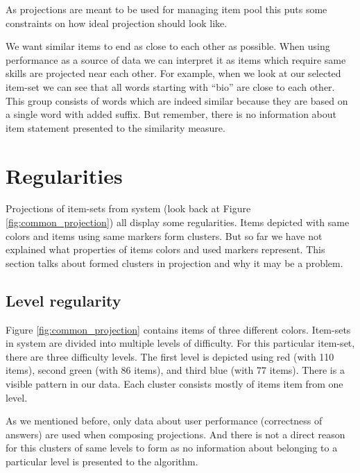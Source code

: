 \documentclass[
  digital, %
  table,   %
  nolof,     %
  nolot,     %
  nocover,
  color,
  final, %
]{fithesis3}
\begin{document}

As projections are meant to be used for managing item pool this puts some constraints on how ideal projection should look like.

We want similar items to end as close to each other as possible. When using performance as a source of data we can interpret it as items which require same skills are projected near each other. For example, when we look at our selected item-set we can see that all words starting with ``bio'' are close to each other. This group consists of words which are indeed similar because they are based on a single word with added suffix. But remember, there is no information about item statement presented to the similarity measure.


\section{Regularities}\label{regularities}


Projections of item-sets from system \umimeCesky{} (look back at Figure \ref{fig:common_projection}) all display some regularities. Items depicted with same colors and items using same markers form clusters. But so far we have not explained what properties of items colors and used markers represent. This section talks about formed clusters in projection and why it may be a problem.


\subsection{Level regularity}\label{regularities-level-regularity}


Figure \ref{fig:common_projection} contains items of three different colors. Item-sets in system \umimeCesky{} are divided into multiple levels of difficulty. For this particular item-set, there are three difficulty levels. The first level is depicted using red (with 110 items), second green (with 86 items), and third blue (with 77 items). There is a  visible pattern in our data. Each cluster consists mostly of items item from one level.

As we mentioned before, only data about user performance (correctness of answers) are used when composing projections. And there is not a direct reason for this clusters of same levels to form as no information about belonging to a particular level is presented to the algorithm.
\end{document}
